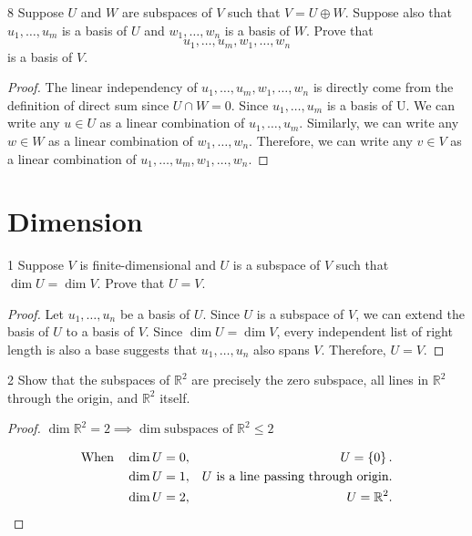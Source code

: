 \documentclass{article}
\newenvironment{problem}[1]{\begin{prob*}{#1}{}}{\end{prob*}}
\newcommand{\R}{\mathbb{R}}
\begin{document}
\begin{problem}{8}
Suppose $U$ and $W$ are subspaces of $V$ such that \(V = U \oplus W\).
Suppose also that \(u_{1},\dots,u_{m}\) is a basis of $U$ and \(w_{1},\dots,w_{n}\)
is a basis of $W$. Prove that \[u_{1},\dots,u_{m}, w_{1},\dots,w_{n}\]
is a basis of $V$.
\end{problem}
\begin{proof}
	The linear independency of \(u_{1},\dots,u_{m}, w_{1},\dots,w_{n}\) is directly come from the definition of direct sum since \(U \cap W = {0}\).
	Since \(u_{1}, \dots, u_{m}\) is a basis of U. We can write any \(u \in U\) as a linear combination of \(u_{1}, \dots, u_{m}\). Similarly, we can write any \(w \in W\) as a linear combination of \(w_{1}, \dots, w_{n}\).
	Therefore, we can write any \(v \in V\) as a linear combination of \(u_{1}, \dots, u_{m}, w_{1}, \dots, w_{n}\).
\end{proof}

\section{Dimension}

\begin{problem}{1}
Suppose $V$ is finite-dimensional and $U$ is a subspace of $V$ such that $ \dim U = \dim V$. Prove that $U = V$.
\end{problem}

\begin{proof}
	Let \(u_1, \dots, u_n\) be a basis of $U$. Since $U$ is a subspace of $V$, we can extend the basis of $U$ to a basis of $V$.
	Since \( \dim U = \dim V\), every independent list of right length is also a base suggests that \(u_{1}, \dots, u_{n}\) also spans $V$. Therefore, \(U = V\).
\end{proof}

\begin{problem}{2}
Show that the subspaces of $\mathbb{R}^2$ are precisely the zero subspace, all lines in $\mathbb{R}^{2}$ through the origin, and $\R^2$ itself.
\end{problem}
\begin{proof}
	\( \dim \mathbb{R}^{2} = 2 \implies \dim \text{subspaces of } \mathbb{R}^{2} \leq 2\)

	\begin{align}
		\text{When} \hspace{10pt} & \dim U = 0, & U  = \set{0}.                               \\
		                          & \dim U = 1, & U \text{ is a line passing through origin.} \\
		                          & \dim U = 2, & U = \mathbb{R}^{2}.
	\end{align}



\end{proof}
\end{document}
